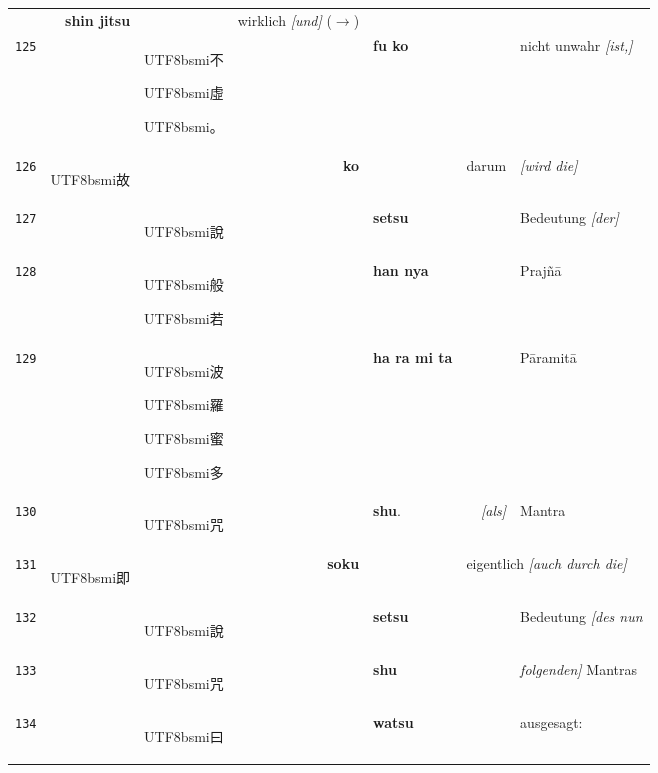\documentclass[
DIV=calc,
BCOR=5mm,
11pt,
headings=small,
oneside,
bibtotocnumbered]{scrartcl}
\newcommand{\cnbsmi}[1]{\begin{CJK}{UTF8}{bsmi}#1\end{CJK}}
\begin{document}
\begin{center}
\begin{tabular}{r|rl|rl|rl}
  ~ & \textbf{shin jitsu}  &
  ~ & \textrm{wirklich \emph{[und]} {\tiny ($\rightarrow$)}} \\  
{\tiny\texttt{125}}&
  ~ & \cnbsmi{不} \cnbsmi{虛} \cnbsmi{。}&
  ~ & \textbf{fu ko} &
  ~ & \textrm{nicht unwahr \emph{[ist,]}} \\
{\tiny\texttt{126}}&
  \cnbsmi{故} & ~ &
  \textbf{ko} & ~ &
  \textrm{darum} & \textrm{\emph{[wird die]} }\\  
{\tiny\texttt{127}}&
  ~ & \cnbsmi{說} & 
  ~ & \textbf{setsu} &
  ~ & \textrm{Bedeutung \emph{[der]}} \\  
 {\tiny\texttt{128}}&
  ~ & \cnbsmi{般} \cnbsmi{若} &
  ~ & \textbf{han nya} &
  ~ & \textrm{Prajñā} \\  
{\tiny\texttt{129}}&
  ~ & \cnbsmi{波} \cnbsmi{羅} \cnbsmi{蜜} \cnbsmi{多}&
  ~ & \textbf{ha ra mi ta} &
  ~ & \textrm{Pāramitā} \\ 
{\tiny\texttt{130}}&
  ~ & \cnbsmi{咒} &
  ~ & \textbf{shu}. & 
  \textrm{\emph{[als]}} & \textrm{Mantra} \\
{\tiny\texttt{131}}&
  \cnbsmi{即} & ~ & 
  \textbf{soku} & ~ &
  \multicolumn{2}{l}{\textrm{eigentlich \emph{[auch durch die]}}} \\  
{\tiny\texttt{132}}&
  ~ & \cnbsmi{說} &
  ~ & \textbf{setsu} & 
  ~ & \textrm{Bedeutung \emph{[des nun}}\\
{\tiny\texttt{133}}&
  ~ & \cnbsmi{咒} &
  ~ & \textbf{shu}  & 
  ~ & \textrm{\emph{folgenden]} Mantras} \\
{\tiny\texttt{134}}&
  ~ & \cnbsmi{曰} &
  ~ & \textbf{watsu} & 
  ~ & \textrm{ausgesagt:} \\ 
\hline
\end{tabular}



\end{center}
\end{document}
